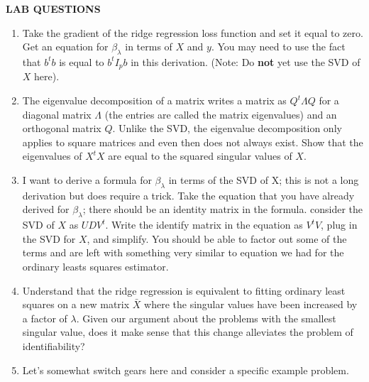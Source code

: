 \documentclass[12pt,hidelinks]{article}
\numberwithin{equation}{section}
\begin{document}

\newpage

\textbf{LAB QUESTIONS}

\vspace*{0pt}

\begin{enumerate}
\item Take the gradient of the ridge regression loss function and set it equal
to zero. Get an equation for $\beta_{\lambda}$ in terms of $X$ and $y$. You may
need to use the fact that $b^t b$ is equal to $b^t I_p b$ in this derivation.
(Note: Do \textbf{not} yet use the SVD of $X$ here).
\item The eigenvalue decomposition of a matrix writes a matrix as $Q^t \Lambda Q$ for
a diagonal matrix $\Lambda$ (the entries are called the matrix eigenvalues) and an
orthogonal matrix $Q$. Unlike the SVD, the eigenvalue decomposition only applies to
square matrices and even then does not always exist. Show that the eigenvalues of
$X^t X$ are equal to the squared singular values of $X$.
\item I want to derive a formula for $\beta_{\lambda}$ in terms of the SVD of X;
this is not a long derivation but does require a trick. Take the equation that you
have already derived for $\beta_{\lambda}$; there should be an identity matrix in
the formula. consider the SVD of $X$ as $UDV^t$. Write the identify matrix in the
equation as $V^tV$, plug in the SVD for $X$, and simplify. You should be able to
factor out some of the terms and are left with something very similar to equation
we had for the ordinary leasts squares estimator.
\item Understand that the ridge regression is equivalent to fitting ordinary
least squares on a new matrix $\bar{X}$ where the singular values have been
increased by a factor of $\lambda$. Given our argument about the problems with
the smallest singular value, does it make sense that this change alleviates the
problem of identifiability?
\item Let's somewhat switch gears here and consider a specific example problem.

\end{enumerate}
\end{document}
